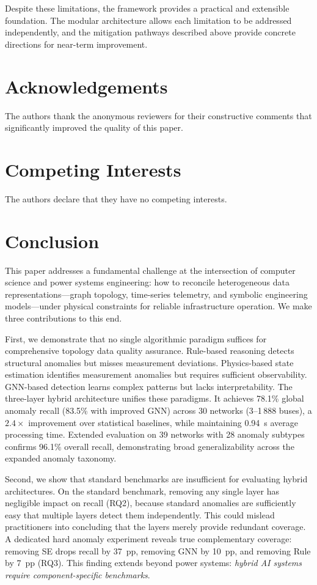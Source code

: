 \documentclass[research]{fcs}
\begin{document}
Despite these limitations, the framework provides a practical and extensible foundation. The modular architecture allows each limitation to be addressed independently, and the mitigation pathways described above provide concrete directions for near-term improvement.

\section*{Acknowledgements}
The authors thank the anonymous reviewers for their constructive comments that significantly improved the quality of this paper. 

\section*{Competing Interests}
The authors declare that they have no competing interests.

\section{Conclusion}

This paper addresses a fundamental challenge at the intersection of computer science and power systems engineering: how to reconcile heterogeneous data representations---graph topology, time-series telemetry, and symbolic engineering models---under physical constraints for reliable infrastructure operation. We make three contributions to this end.

First, we demonstrate that no single algorithmic paradigm suffices for comprehensive topology data quality assurance. Rule-based reasoning detects structural anomalies but misses measurement deviations. Physics-based state estimation identifies measurement anomalies but requires sufficient observability. GNN-based detection learns complex patterns but lacks interpretability. The three-layer hybrid architecture unifies these paradigms. It achieves 78.1\% global anomaly recall (83.5\% with improved GNN) across 30 networks (3--1\,888 buses), a $2.4\times$ improvement over statistical baselines, while maintaining 0.94~s average processing time. Extended evaluation on 39 networks with 28 anomaly subtypes confirms 96.1\% overall recall, demonstrating broad generalizability across the expanded anomaly taxonomy.

Second, we show that standard benchmarks are insufficient for evaluating hybrid architectures. On the standard benchmark, removing any single layer has negligible impact on recall (RQ2), because standard anomalies are sufficiently easy that multiple layers detect them independently. This could mislead practitioners into concluding that the layers merely provide redundant coverage. A dedicated hard anomaly experiment reveals true complementary coverage: removing SE drops recall by 37~pp, removing GNN by 10~pp, and removing Rule by 7~pp (RQ3). This finding extends beyond power systems: \emph{hybrid AI systems require component-specific benchmarks}.
\end{document}
